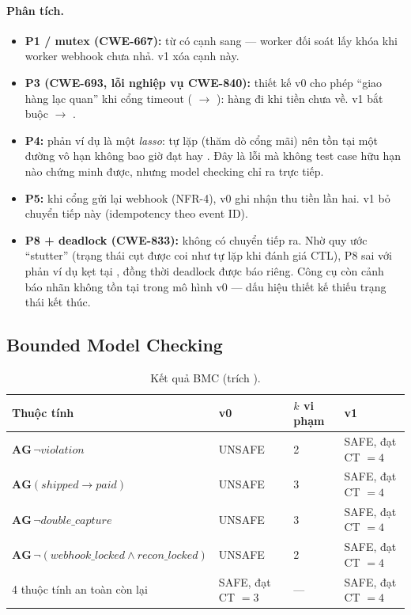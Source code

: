 \paragraph{Phân tích.}
\begin{itemize}
  \item \textbf{P1 / mutex (CWE-667):} từ  có cạnh sang 
        — worker đối soát lấy khóa khi worker webhook chưa nhả. v1 xóa cạnh này.
  \item \textbf{P3 (CWE-693, lỗi nghiệp vụ CWE-840):} thiết kế v0 cho phép ``giao hàng lạc quan''
        khi cổng timeout ( $\to$ ): hàng đi khi tiền chưa về.
        v1 bắt buộc  $\to$ .
  \item \textbf{P4:} phản ví dụ là một \emph{lasso}:  tự lặp (thăm dò cổng mãi) nên
        tồn tại một đường vô hạn không bao giờ đạt  hay . Đây là lỗi mà
        không test case hữu hạn nào chứng minh được, nhưng model checking chỉ ra trực tiếp.
  \item \textbf{P5:} khi cổng gửi lại webhook (NFR-4), v0 ghi nhận thu tiền lần hai. v1 bỏ
        chuyển tiếp này (idempotency theo event ID).
  \item \textbf{P8 + deadlock (CWE-833):}  không có chuyển tiếp ra. Nhờ quy ước
        ``stutter'' (trạng thái cụt được coi như tự lặp khi đánh giá CTL), P8 sai với phản ví dụ
        kẹt tại , đồng thời deadlock được báo riêng. Công cụ còn cảnh báo nhãn
         không tồn tại trong mô hình v0 — dấu hiệu thiết kế thiếu trạng thái kết thúc.
\end{itemize}

\subsection{Bounded Model Checking}
\begin{table}[H]
\centering\small
\caption{Kết quả BMC (trích ).}
\label{tab:bmc}
\begin{tabular}{@{}l l l l@{}}
\toprule
Thuộc tính & v0 & $k$ vi phạm & v1 \\
\midrule
$\mathbf{AG}\,\neg\mathit{violation}$ & UNSAFE & 2 & SAFE, đạt CT $=4$ \\
$\mathbf{AG}(\mathit{shipped}\rightarrow\mathit{paid})$ & UNSAFE & 3 & SAFE, đạt CT $=4$ \\
$\mathbf{AG}\,\neg\mathit{double\_capture}$ & UNSAFE & 3 & SAFE, đạt CT $=4$ \\
$\mathbf{AG}\,\neg(\mathit{webhook\_locked}\wedge\mathit{recon\_locked})$ & UNSAFE & 2 & SAFE, đạt CT $=4$ \\
4 thuộc tính an toàn còn lại & SAFE, đạt CT $=3$ & — & SAFE, đạt CT $=4$ \\
\bottomrule
\end{tabular}
\end{table}

